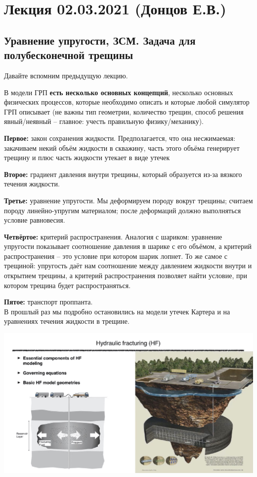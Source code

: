 \documentclass[main.tex]{subfiles}
\begin{document}

\section{Лекция 02.03.2021 (Донцов Е.В.)}

\subsection{Уравнение упругости, ЗСМ. Задача для полубесконечной трещины}

Давайте вспомним предыдущую лекцию.

В модели ГРП \textbf{есть несколько основных концепций}, несколько основных физических процессов, которые необходимо описать и которые любой симулятор ГРП описывает (не важны тип геометрии, количество трещин, способ решения явный/неявный -- главное: учесть правильную физику/механику).

\textbf{Первое:} закон сохранения жидкости.
Предполагается, что она несжимаемая: закачиваем некий объём жидкости в скважину, часть этого объёма генерирует трещину и плюс часть жидкости утекает в виде утечек

\textbf{Второе:} градиент давления внутри трещины, который образуется из-за вязкого течения жидкости.

\textbf{Третье:} уравнение упругости.
Мы деформируем породу вокруг трещины; считаем породу линейно-упругим материалом; после деформаций должно выполняться условие равновесия.

\textbf{Четвёртое:} критерий распространения.
Аналогия с шариком: уравнение упругости показывает соотношение давления в шарике с его объёмом, а критерий распространения -- это условие при котором шарик лопнет.
То же самое с трещиной: упругость даёт нам соотношение между давлением жидкости внутри и открытием трещины, а критерий распространения позволяет найти условие, при котором трещина будет распространяться.

\textbf{Пятое:} транспорт проппанта.
\\

В прошлый раз мы подробно остановились на модели утечек Картера и на уравнениях течения жидкости в трещине.

\includegraphics[width=\textwidth, page=9]{HF_slides.pdf}
\end{document}
